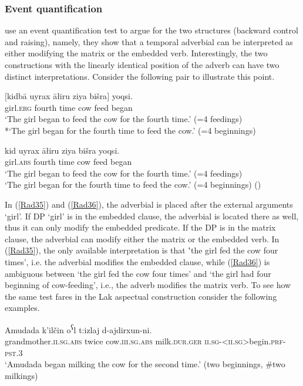 \documentclass[output=paper]{langscibook}
\begin{document}
\subsubsection{Event quantification}
\citet{PolinskyPotsdam2002} use an event quantification test to argue for the two structures (backward control and raising), namely, they show that a temporal adverbial can be interpreted as either modifying the matrix or the embedded verb. Interestingly, the two constructions with the linearly identical position of the adverb can have two distinct interpretations. Consider the following pair to illustrate this point.

\ea\label{Rad35}
\gll $[$kidbā uyrax āłiru ziya bišra$]$ yoqsi.\\
 girl.\textsc{erg} fourth time cow feed began\\
\glt ‘The girl began to feed the cow for the fourth time.’ (=4 feedings)\\
*‘The girl began for the fourth time to feed the cow.’ (=4 beginnings)
\z 

\ea\label{Rad36}
\gll kid uyrax āłiru ziya bišra yoqsi.\\
girl.\textsc{abs} fourth time cow feed began\\
\glt ‘The girl began to feed the cow for the fourth time.’ (=4 feedings)\\
‘The girl began for the fourth time to feed the cow.’ (=4 beginnings) (\citealt[255]{PolinskyPotsdam2002})
\z 

In (\ref{Rad35}) and (\ref{Rad36}), the adverbial is placed after the external arguments ‘girl’. If DP ‘girl’ is in the embedded clause, the adverbial is located there as well, thus it can only modify the embedded predicate. If the DP is in the matrix clause, the adverbial can modify either the matrix or the embedded verb. In (\ref{Rad35}), the only available interpretation is that ‛the girl fed the cow four times’, i.e. the adverbial modifies the embedded clause, while (\ref{Rad36}) is ambiguous between ‘the girl fed the cow four times’ and ‘the girl had four beginning of cow-feeding’, i.e., the adverb modifies the matrix verb. To see how the same test fares in the Lak aspectual construction consider the following examples.

\ea\label{Rad37}
\gll Amudada k’ilčin o\textsuperscript{ʕ}l t:izlaj d-ajdirxun-ni.\\
grandmother.\textsc{ii.sg.abs} twice cow.\textsc{iii.sg.abs} milk.\textsc{dur.ger} \textsc{ii.sg-<ii.sg>}begin.\textsc{prf-pst.3}\\
\glt ‘Amudada began milking the cow for the second time.’ (two beginnings, \#two milkings)\\
\z 
\end{document}
